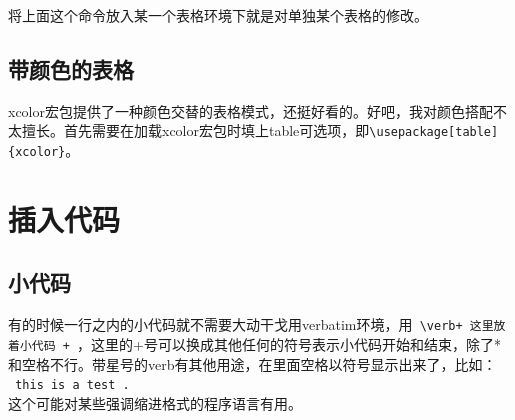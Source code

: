 \documentclass[11pt,oneside]{book}
\begin{document}
将上面这个命令放入某一个表格环境下就是对单独某个表格的修改。

\section[带颜色的表格]{带颜色的表格}
\label{sec:带颜色的表格}
xcolor宏包提供了一种颜色交替的表格模式，还挺好看的。好吧，我对颜色搭配不太擅长。首先需要在加载xcolor宏包时填上table可选项，即\verb+\usepackage[table]{xcolor}+。

\begin{table}[H]
\centering
{}
\caption{带颜色的表格}
\label{tab:带颜色的表格}
\end{table}




\chapter{插入代码}
\section{小代码}
有的时候一行之内的小代码就不需要大动干戈用verbatim环境，用\verb| \verb+ 这里放着小代码 + |，这里的+号可以换成其他任何的符号表示小代码开始和结束，除了*和空格不行。带星号的verb有其他用途，在里面空格以符号显示出来了，比如：\\
\verb*| this is a test . | \\这个可能对某些强调缩进格式的程序语言有用。
\end{document}
